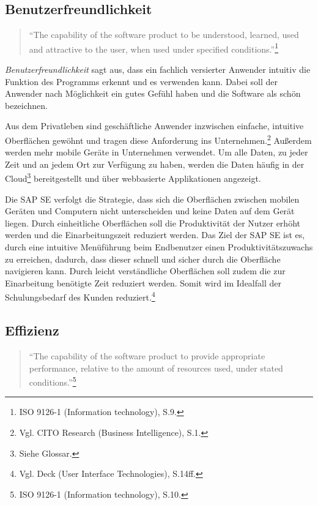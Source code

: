         \subsection{Benutzerfreundlichkeit}

            \begin{quote}
              \enquote{The capability of the software product to be understood, learned, used and attractive to the user, when used under specified conditions.}\footnote{ISO 9126-1 (Information technology), S.9.}
            \end{quote}

            \emph{Benutzerfreundlichkeit} sagt aus, dass ein fachlich versierter Anwender intuitiv die Funktion des Programms erkennt und es verwenden kann. Dabei soll der Anwender nach Möglichkeit ein gutes Gefühl haben und die Software als schön bezeichnen.

            Aus dem Privatleben sind geschäftliche Anwender inzwischen einfache, intuitive Oberflächen gewöhnt und tragen diese Anforderung ins Unternehmen.\footnote{Vgl. CITO Research (Business Intelligence), S.1.} Außerdem werden mehr mobile Geräte in Unternehmen verwendet. Um alle Daten, zu jeder Zeit und an jedem Ort zur Verfügung zu haben, werden die Daten häufig in der Cloud\footnote{Siehe Glossar.} bereitgestellt und über webbasierte Applikationen angezeigt.

            Die SAP SE verfolgt die Strategie, dass sich die Oberflächen zwischen mobilen Geräten und Computern nicht unterscheiden und keine Daten auf dem Gerät liegen. Durch einheitliche Oberflächen soll die Produktivität der Nutzer erhöht werden und die Einarbeitungszeit reduziert werden.
            Das Ziel der SAP SE ist es, durch eine intuitive Menüführung beim Endbenutzer einen Produktivitätszuwachs zu erreichen, dadurch, dass dieser schnell und sicher durch die Oberfläche navigieren kann. Durch leicht verständliche Oberflächen soll zudem die zur Einarbeitung benötigte Zeit reduziert werden. Somit wird im Idealfall der Schulungsbedarf des Kunden reduziert.\footnote{Vgl. Deck (User Interface Technologies), S.14ff.}

        \subsection{Effizienz}

            \begin{quote}
              \enquote{The capability of the software product to provide appropriate performance, relative to the amount of resources used, under stated conditions.}\footnote{ISO 9126-1 (Information technology), S.10.}
            \end{quote}

